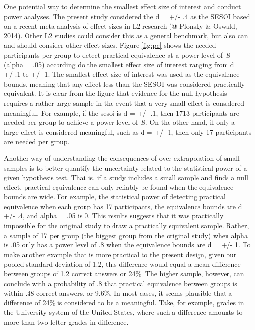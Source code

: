 \documentclass[
  man]{apa6}
\begin{document}
One potential way to determine the smallest effect size of interest and conduct power analyses.
The present study considered the d = +/- .4 as the SESOI based on a recent meta-analysis of effect sizes in L2 research (@ Plonsky \& Oswald, 2014).
Other L2 studies could consider this as a general benchmark, but also can and should consider other effect sizes.
Figure \ref{fig:pc} shows the needed participants per group to detect practical equivalence at a power level of .8 (alpha = .05) according do the smallest effect size of interest ranging from d = +/-.1 to +/- 1.
The smallest effect size of interest was used as the equivalence bounds, meaning that any effect less than the SESOI was considered practically equivalent.
It is clear from the figure that evidence for the null hypothesis requires a rather large sample in the event that a very small effect is considered meaningful.
For example, if the sesoi is d = +/- .1, then 1713 participants are needed per group to achieve a power level of .8.
On the other hand, if only a large effect is considered meaningful, such as d = +/- 1, then only 17 participants are needed per group.

Another way of understanding the consequences of over-extrapolation of small samples is to better quantify the uncertainty related to the statistical power of a given hypothesis test.
That is, if a study includes a small sample and finds a null effect, practical equivalence can only reliably be found when the equivalence bounds are wide.
For example, the statistical power of detecting practical equivalence when each group has 17 participants, the equivalence bounds are d = +/- .4, and alpha = .05 is 0.
This results suggests that it was practically impossible for the original study to draw a practically equivalent sample.
Rather, a sample of 17 per group (the biggest group from the original study) when alpha is .05 only has a power level of .8 when the equivalence bounds are d = +/- 1.
To make another example that is more practical to the present design, given our pooled standard deviation of 1.2, this difference would equal a mean difference between groups of 1.2 correct answers or 24\%.
The higher sample, however, can conclude with a probability of .8 that practical equivalence between groups is within .48 correct answers, or 9.6\%.
In most cases, it seems plausible that a difference of 24\% is considered to be a meaningful.
Take, for example, grades in the University system of the United States, where such a difference amounts to more than two letter grades in difference.
\end{document}
